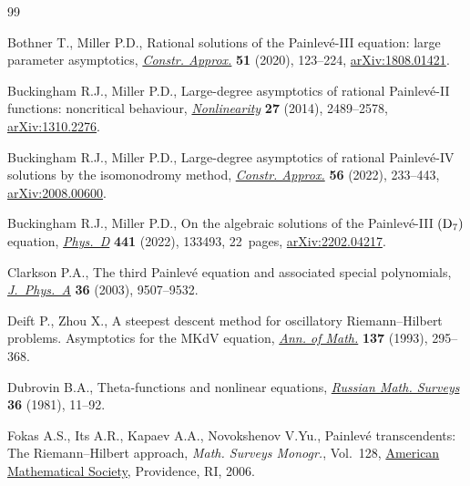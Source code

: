 \documentclass[pdftex]{sigma}
\numberwithin{equation}{section}
\begin{document}
\begin{thebibliography}{99}
\footnotesize\itemsep=0pt

Bothner T., Miller P.D., Rational solutions of the {P}ainlev\'e-{III} equation:
 large parameter asymptotics, \href{https://doi.org/10.1007/s00365-019-09463-4}{\textit{Constr. Approx.}} \textbf{51} (2020),
 123--224, \href{https://arxiv.org/abs/1808.01421}{arXiv:1808.01421}.

Buckingham R.J., Miller P.D., Large-degree asymptotics of rational
 {P}ainlev\'e-{II} functions: noncritical behaviour, \href{https://doi.org/10.1088/0951-7715/27/10/2489}{\textit{Nonlinearity}}
 \textbf{27} (2014), 2489--2578, \href{https://arxiv.org/abs/1310.2276}{arXiv:1310.2276}.

Buckingham R.J., Miller P.D., Large-degree asymptotics of rational
 {P}ainlev\'e-{IV} solutions by the isomonodromy method, \href{https://doi.org/10.1007/s00365-022-09586-1}{\textit{Constr.
 Approx.}} \textbf{56} (2022), 233--443, \href{https://arxiv.org/abs/2008.00600}{arXiv:2008.00600}.

Buckingham R.J., Miller P.D., On the algebraic solutions of the
 {P}ainlev\'e-{III} {$(\rm D_7)$} equation, \href{https://doi.org/10.1016/j.physd.2022.133493}{\textit{Phys.~D}} \textbf{441}
 (2022), 133493, 22~pages, \href{https://arxiv.org/abs/2202.04217}{arXiv:2202.04217}.

Clarkson P.A., The third {P}ainlev\'e equation and associated special
 polynomials, \href{https://doi.org/10.1088/0305-4470/36/36/306}{\textit{J.~Phys.~A}} \textbf{36} (2003), 9507--9532.

Deift P., Zhou X., A steepest descent method for oscillatory
 {R}iemann--{H}ilbert problems. {A}symptotics for the {MK}d{V} equation,
 \href{https://doi.org/10.2307/2946540}{\textit{Ann. of Math.}} \textbf{137} (1993), 295--368.

Dubrovin B.A., Theta-functions and nonlinear equations, \href{https://doi.org/10.1070/RM1981v036n02ABEH002596}{\textit{Russian Math.
 Surveys}} \textbf{36} (1981), 11--92.

Fokas A.S., Its A.R., Kapaev A.A., Novokshenov V.Yu., Painlev\'e transcendents:
 {T}he {R}iemann--{H}ilbert approach, \textit{Math. Surveys Monogr.}, Vol.~128, \href{https://doi.org/10.1090/surv/128}{American Mathematical Society}, Providence, RI, 2006.


\end{thebibliography}
\end{document}
